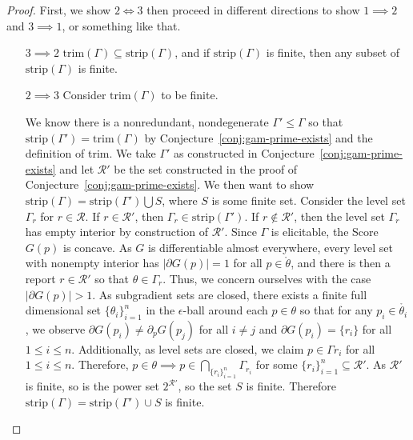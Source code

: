 \documentclass[12pt]{article}
\newcommand{\Comments}{1}
\newcommand{\mynote}[2]{\ifnum\Comments=1\textcolor{#1}{#2}\fi}
\newcommand{\jessie}[1]{\mynote{purple}{[JF: #1]}}
\newcommand{\R}{\mathcal{R}}
\newcommand{\inter}[1]{\mathring{#1}}%
\newcommand{\trim}{\mathrm{trim}}
\newcommand{\strip}{\mathrm{strip}}
\begin{document}
\begin{proof}
First, we show $2 \iff 3$ then proceed in different directions to show $1\implies 2$ and $3 \implies 1$, or something like that.

\begin{enumerate}
	\item [$3 \implies 2$]
	$\trim(\Gamma) \subseteq \strip(\Gamma)$, and if $\strip(\Gamma)$ is finite, then any subset of $\strip(\Gamma)$ is finite.
	
	\item[$2 \implies 3$] 
	Consider $\trim(\Gamma)$ to be finite.
	
	We know there is a nonredundant, nondegenerate $\Gamma' \leq \Gamma$ so that $\strip(\Gamma') = \trim(\Gamma)$ by Conjecture~\ref{conj:gam-prime-exists} and the definition of trim.
	We take $\Gamma'$ as constructed in Conjecture~\ref{conj:gam-prime-exists} and let $\R'$ be the set constructed in the proof of Conjecture~\ref{conj:gam-prime-exists}.
	We then want to show $\strip(\Gamma) = \strip(\Gamma') \bigcup S$, where $S$ is some finite set.
	Consider the level set $\Gamma_r$ for $r \in \R$.
	If $r \in \R'$, then $\Gamma_r \in \strip(\Gamma')$.
	If $r \not \in \R'$, then the level set $\Gamma_r$ has empty interior by construction of $\R'$.
	Since $\Gamma$ is elicitable, the Score $G(p)$ is concave.
	As $G$ is differentiable almost everywhere, every level set with nonempty interior has $|\partial G(p)| = 1$ for all $p \in \inter{\theta}$, and there is then a report $r \in \R'$ so that $\theta \in \Gamma_r$.
	Thus, we concern ourselves with the case $|\partial G(p)| > 1$.
	As subgradient sets are closed, there exists a finite full dimensional set $\{\theta_i\}_{i=1}^n$ in the $\epsilon$-ball around each $p \in \theta$ so that for any $p_i \in \inter{\theta_i}$, we observe $\partial G(p_i) \neq \partial_p G(p_j)$ for all $i \neq j$ and $\partial G(p_i) = \{r_i\}$ for all $1 \leq i \leq n$.
	Additionally, as level sets are closed, we claim $p \in \Gamma{r_i}$ for all $1 \leq i \leq n$.
	Therefore, $p \in \theta \implies p \in \bigcap_{\{r_i\}_{i=1}^n} \Gamma_{r_i}$ for some $\{r_i\}_{i=1}^n \subseteq \R'$.
	As $\R'$ is finite, so is the power set $2^{\R'}$, so the set $S$ is finite.
	Therefore $\strip(\Gamma) = \strip(\Gamma') \cup S$ is finite. 
	

\end{enumerate}
\end{proof}
\end{document}
